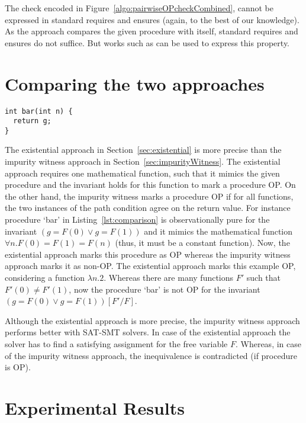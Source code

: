 \documentclass{llncs}
\newcommand{\F}{\mathit{F}}
\begin{document}
The check encoded in Figure~\ref{algo:pairwiseOPcheckCombined}, cannot
be expressed in standard requires and ensures (again, to the best of
our knowledge). As the approach compares the given procedure with
itself, standard requires and ensures do not suffice. But works such as
\cite{lahiri2013differential} can be used to express this property. 

\section{Comparing the two approaches}

\begin{lstlisting}[caption={Procedure `bar': illustrates that
      existential approach is more precise that the impurity witness
      approach.}, label=lst:comparison]
int bar(int n) { 
  return g; 
}
\end{lstlisting}

The existential approach in Section~\ref{sec:existential} is more
precise than the impurity witness approach in
Section~\ref{sec:impurityWitness}. The existential approach requires
one mathematical function, such that it mimics the given procedure and
the invariant holds for this function to mark a procedure OP. On the
other hand, the impurity witness marks a procedure OP if for all
functions, the two instances of the path condition agree on the return
value. For instance procedure `bar' in Listing~\ref{lst:comparison} is
observationally pure for the invariant $(g = \F(0) \vee g = \F(1))$
and it mimics the mathematical function $\forall n. \F(0) = \F(1) =
\F(n)$ (thus, it must be a constant function). Now, the existential
approach marks this procedure as OP whereas the impurity witness
approach marks it as non-OP. The existential approach marks this
example OP, considering a function $\lambda n. 2$. Whereas there are
many functions $\F'$ such that $\F'(0) \neq \F'(1)$, now the procedure
`bar' is not OP for the invariant $(g = \F(0) \vee g =
\F(1))[\F'/\F]$.

Although the existential approach is more precise, the impurity
witness approach performs better with SAT-SMT solvers. In case of the
existential approach the solver has to find a satisfying assignment
for the free variable $\F$. Whereas, in case of the impurity witness
approach, the inequivalence is contradicted (if procedure is OP).

\section{Experimental Results}
\end{document}
